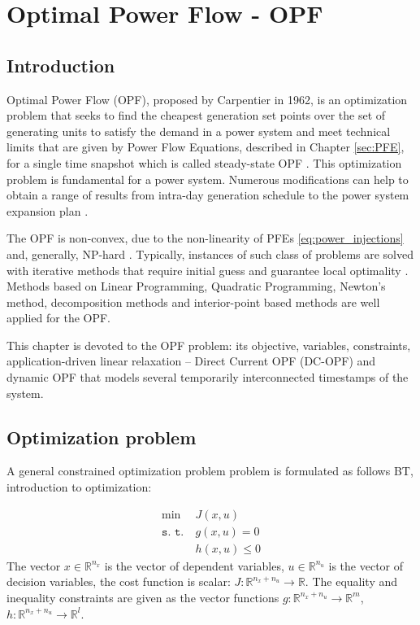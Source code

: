 \chapter{Optimal Power Flow - OPF}
\label{chap:opf}

\section{Introduction}

Optimal Power Flow (OPF), proposed by Carpentier in 1962, is an optimization problem that seeks to find the cheapest generation set points over the set of generating units to satisfy the demand in a power system and meet technical limits that are given by Power Flow Equations, described in Chapter \ref{sec:PFE}, for a single time snapshot which is called steady-state OPF \cite{carpentier1962contribution}. This optimization problem is fundamental for a power system. Numerous modifications can help to obtain a range of results from intra-day generation schedule to the power system expansion plan \cite{bai2008semidefinite, molzahn2014investigation}.

The OPF is non-convex, due to the non-linearity of PFEs \eqref{eq:power_injections} and, generally, NP-hard \cite{lavaei2011zero}. Typically, instances of such class of problems are solved with iterative methods that require initial guess and guarantee local optimality \cite{molzahn2018towards}. Methods based on Linear Programming, Quadratic Programming, Newton's method, decomposition methods and interior-point based methods are well applied for the OPF. %

This chapter is devoted to the OPF problem: its objective, variables, constraints, application-driven linear relaxation -- Direct Current OPF (DC-OPF) and dynamic OPF that models several temporarily interconnected timestamps of the system.

\section{Optimization problem}

A general constrained optimization problem problem is formulated as follows {\cite{red} BT, introduction to optimization}:

\begin{equation}
    \begin{aligned}
        \min            & J(x, u)    \\
        \texttt{s. t.}~ & g(x, u) = 0 \\
                        & h(x, u) \leq 0
    \end{aligned}
    \label{eq:constrained_opt}
\end{equation}
The vector $x \in \mathbb{R}^{n_x}$ is the vector of dependent variables, $u \in \mathbb{R}^{n_u}$ is the vector of decision variables, the cost function is scalar: $J: \mathbb{R}^{n_x + n_u} \to \mathbb{R}$. The equality and inequality constraints are given as the vector functions $g: \mathbb{R}^{n_x + n_u} \to \mathbb{R}^{m}$, $h: \mathbb{R}^{n_x + n_u} \to \mathbb{R}^{l}$. 

